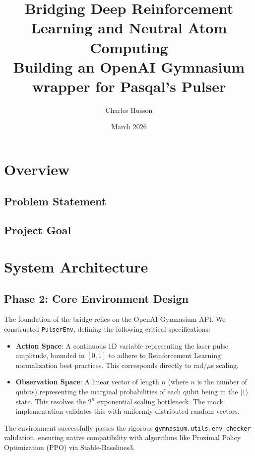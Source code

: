 \documentclass{article}
\title{\textbf{Bridging Deep Reinforcement Learning and Neutral Atom Computing}\\
\large Building an OpenAI Gymnasium wrapper for Pasqal's Pulser}
\author{Charles Husson}
\date{March 2026}
\begin{document}
\maketitle
\thispagestyle{fancy}
\section{Overview}

\subsection{Problem Statement}

\subsection{Project Goal}

\section{System Architecture}

\subsection{Phase 2: Core Environment Design}
The foundation of the bridge relies on the OpenAI Gymnasium API. We constructed \texttt{PulserEnv}, defining the following critical specifications:
\begin{itemize}
    \item \textbf{Action Space}: A continuous 1D variable representing the laser pulse amplitude, bounded in $[0, 1]$ to adhere to Reinforcement Learning normalization best practices. This corresponds directly to rad/$\mu$s scaling.
    \item \textbf{Observation Space}: A linear vector of length $n$ (where $n$ is the number of qubits) representing the marginal probabilities of each qubit being in the $|1\rangle$ state. This resolves the $2^n$ exponential scaling bottleneck. The mock implementation validates this with uniformly distributed random vectors.
\end{itemize}
The environment successfully passes the rigorous \texttt{gymnasium.utils.env\_checker} validation, ensuring native compatibility with algorithms like Proximal Policy Optimization (PPO) via Stable-Baselines3.
\end{document}
